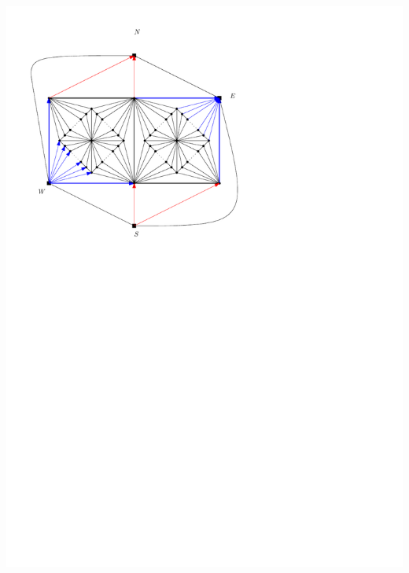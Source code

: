 \documentclass[a4paper]{article}
\begin{document}
\includegraphics[width=\textwidth]{fixExtension/img/manymany1}
\clearpage%
\end{document}
